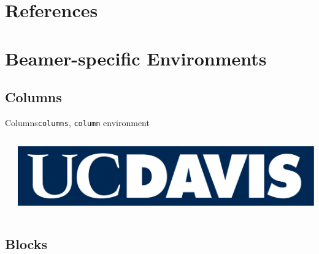 \documentclass{beamer}
\begin{document}

    \section*{References}


    \section{Beamer-specific Environments}

    \subsection{Columns}

    \begin{frame}{Columns}{\texttt{columns}, \texttt{column} environment}
    \begin{columns}
        \begin{column}{0.5\textwidth} %
            \tiny{\lipsum[1-1]}
        \end{column}

        \begin{column}{0.5\textwidth} %
            \includegraphics[width=0.9\columnwidth]{Theme/Logos/DavisLogoV3.png}
        \end{column}
    \end{columns}
    \end{frame}

    \subsection{Blocks}
\end{document}

